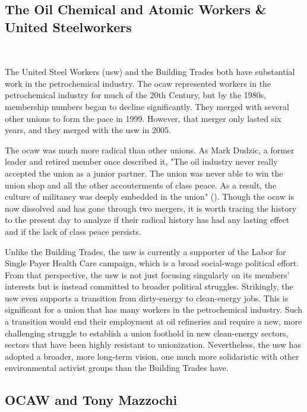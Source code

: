 \documentclass[12pt]{article}
\begin{document}
\subsection{The Oil Chemical and Atomic Workers \& United Steelworkers}\label{subsec:ocaw} \

The United Steel Workers (\acrshort{usw}) and the Building Trades both have substantial work in the petrochemical industry. The \acrfull{ocaw} represented workers in the petrochemical industry for much of the 20th Century, but by the 1980s, membership numbers began to decline significantly. They merged with several other unions to form the \acrfull{pace} in 1999. However, that merger only lasted six years, and they merged with the \acrshort{usw} in 2005.

The \acrshort{ocaw} was much more radical than other unions. As Mark Dudzic, a former leader and retired member once described it, "The oil industry never really accepted the union as a junior partner. The union was never able to win the union shop and all the other accouterments of class peace. As a result, the culture of militancy was deeply embedded in the union" (\cite{leopoldManWhoHated2007}). Though the \acrshort{ocaw} is now dissolved and has gone through two mergers, it is worth tracing the history to the present day to analyze if their radical history has had any lasting effect and if the lack of class peace persists.

Unlike the Building Trades, the \acrshort{usw} is currently a supporter of the Labor for Single Payer Health Care campaign, which is a broad social-wage political effort. From that perspective, the \acrshort{usw} is not just focusing singularly on its members’ interests but is instead committed to broader political struggles. Strikingly, the \acrshort{usw} even supports a transition from dirty-energy to clean-energy jobs. This is significant for a union that has many workers in the petrochemical industry. Such a transition would end their employment at oil refineries and require a new, more challenging struggle to establish a union foothold in new clean-energy sectors, sectors that have been highly resistant to unionization. Nevertheless, the \acrshort{usw} has adopted a broader, more long-term vision, one much more solidaristic with other environmental activist groups than the Building Trades have.

\subsection{OCAW and Tony Mazzochi} \
\end{document}
